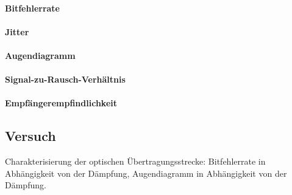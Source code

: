 \documentclass[a4paper]{article}
\begin{document}
\paragraph{Bitfehlerrate}
\paragraph{Jitter}
\paragraph{Augendiagramm}
\paragraph{Signal-zu-Rausch-Verhältnis}
\paragraph{Empfängerempfindlichkeit}

\subsection{Versuch}
Charakterisierung der optischen Übertragungsstrecke:
Bitfehlerrate in Abhängigkeit von der Dämpfung,
Augendiagramm in Abhängigkeit von der Dämpfung.
\end{document}
